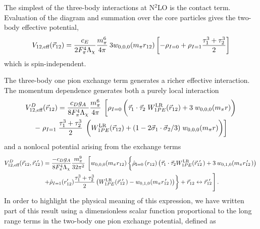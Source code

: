 The simplest of the three-body interactions at N$^2$LO is the contact term. Evaluation of the diagram and summation over the core particles gives the two-body effective potential,
\begin{equation}
V_{12,\text{eff}}(\vec{r}_{12})=\frac{c_E }{2F_\pi^4\Lambda_\chi}\frac{m_\pi^6}{4\pi}\:3w_{0,0,0}(m_\pi r_{12})\left[-\rho_{I=0}+ \rho_{I=1}\frac{\tau_1^3+\tau_2^3}{2} \right]
\end{equation}
which is spin-independent.

The three-body one pion exchange term generates a richer effective interaction. The momentum dependence generates both a purely local interaction
\begin{multline}
V^{D}_{12,\text{eff}}(\rot)=
\frac{c_D g_A}{8 F_\pi^4 \Lambda_\chi} \frac{m_\pi^6}{4\pi}\: \left[\rho_{I=0}\left(\fracphantom\taudot\; W^{\text{LR}}_{1PE}(\rot)  +3\;\w{0}{0}{0}{m_\pi r}\right) \right. \\
-\left. \rho_{I=1}\;\tauplusthree \;\left(\fracphantom W^{\text{LR}}_{1PE}(\rot)+(1-2\sigmadot/3)\;\w{0}{0}{0}{m_\pi r}\right) \right]
\end{multline}
and a nonlocal potential arising from the exchange terms 
\begin{multline}\label{eq:1PENonlocal}
V^{D}_{12,\text{eff}}(\rot,\rotp)=\frac{-c_D g_A }{8 F_\pi^4 \Lambda_\chi} \frac{m_\pi^9}{32\pi^2}\:  \left[ \w{0}{0}{0}{m_\pi r_{12}} \left\{\fracphantom \rhohat{0}{r_{12}}\left(\taudot W^{\text{LR}}_{1PE}(\rotp)+3\:\w{0}{1}{0}{m_\pi \rotpr}\right) \right.\right. \\
\left.\left.+\hat{\rho}_{I=1}(r'_{12}) \tauplusthree \left( W^{\text{LR}}_{1PE}(\rotp)-\w{0}{1}{0}{m_\pi \rotpr}\right) \right\} + \rot \leftrightarrow \rotp \vphantom{\left(\yukawa{r}^2\right)} \right].
\end{multline}
In order to highlight the physical meaning of this expression, we have written part of this result using a dimensionless scalar function proportional to the long range terms in the two-body one pion exchange potential, defined as
